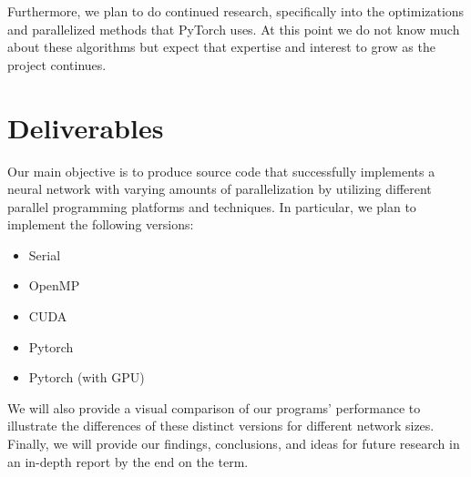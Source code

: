 \documentclass[10pt,twocolumn,letterpaper]{article}
\begin{document}
Furthermore, we plan to do continued research, specifically into the optimizations and parallelized methods that PyTorch uses. 
At this point we do not know much about these algorithms but expect that expertise and interest to
grow as the project continues.

\section{Deliverables}
Our main objective is to produce source code that successfully implements a neural network with varying amounts of parallelization by utilizing different parallel programming platforms and techniques. 
In particular, we plan to implement the following versions:
\begin{itemize}
    \item Serial
    \item OpenMP
    \item CUDA
    \item Pytorch
    \item Pytorch (with GPU)
\end{itemize} 
%
We will also provide a visual comparison of our programs' performance to illustrate the differences of these distinct versions for different network sizes. 
%
Finally, we will provide our findings, conclusions, and ideas for future research in an in-depth report by the end on the term.

%

%
 
%
\end{document}
